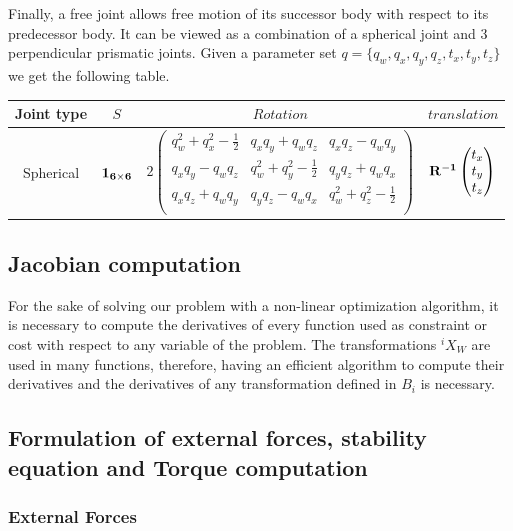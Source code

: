 Finally, a free joint allows free motion of its successor body with respect to its predecessor body.
It can be viewed as a combination of a spherical joint and 3 perpendicular prismatic joints.
Given a parameter set $q = \{ q_w, q_x, q_y, q_z, t_x, t_y, t_z\}$ we get the following table.

\begin{tabular}{|c|c|c|c|}
  \hline
  Joint type & $S$ & $Rotation$ & $translation$ \\
  \hline
  Spherical
  &
  $\bf{1}_{6\times 6}$
  &
  $2 \begin{pmatrix}
    q_w^2 +q_x^2-\frac{1}{2} & q_x q_y + q_w q_z & q_x q_z - q_w q_y \\
    q_x q_y - q_w q_z & q_w^2 +q_y^2-\frac{1}{2} & q_y q_z + q_w q_x \\
    q_x q_z + q_w q_y & q_y q_z - q_w q_x & q_w^2 +q_z^2-\frac{1}{2} \\
  \end{pmatrix}$
  &
  $\bf{R}^{-1}\begin{pmatrix}
    t_x \\ t_y \\ t_z
  \end{pmatrix}$
  \\
  \hline
\end{tabular}

\subsection{Jacobian computation}
\label{sub:jacobian_computation}

For the sake of solving our problem with a non-linear optimization algorithm, it is necessary to compute the derivatives of every function used as constraint or cost with respect to any variable of the problem.
The transformations $^iX_W$ are used in many functions, therefore, having an efficient algorithm to compute their derivatives and the derivatives of any transformation defined in $B_i$ is necessary.

\subsection{Formulation of external forces, stability equation and Torque computation}
\label{sub:formulation_of_external_forces_stability_equation_and_torque_computation}

\subsubsection{External Forces}
\label{subsub:external_forces}

